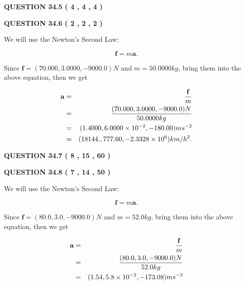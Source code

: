 \documentclass[12pt]{article}
\begin{document}
 
 
  
\vspace{0.2in}
  
{\textbf{\Large{QUESTION
34.5 
 (           4 ,           4 ,           4 )
}}}
  
  
  
\vspace{0.2in}
  
{\textbf{\Large{QUESTION
34.6 
 (           2 ,           2 ,           2 )
}}}
  
  
 
 

We will use the Newton's Second Law:
 
\[
\mathbf{f}=m\mathbf{a}.
\]
 
Since $\mathbf{f}=( %
70.000,  %
3.0000,  %
-9000.0 )N$
and $m= %
50.0000kg$, bring them into the above equation, then we get
 
\begin{eqnarray*}
\mathbf{a}&=&\frac{\mathbf{f}}m  \\
&=&\frac{(
70.000 ,
3.0000 ,
-9000.0 )N
}{ %
50.0000 kg}  \\
&=&(
1.4000 ,
6.0000 \times 10^{-2},
-180.00
)ms^{-2} \\
&=&(
18144. ,
777.60 ,
-2.3328 \times 10^{6}
)km/h^2.
\end{eqnarray*}
 
 
 
  
\vspace{0.2in}
  
{\textbf{\Large{QUESTION
34.7 
 (           8 ,          15 ,          60 )
}}}
  
  
 
 

 
 
  
\vspace{0.2in}
  
{\textbf{\Large{QUESTION
34.8 
 (           7 ,          14 ,          50 )
}}}
  
  
 
 

We will use the Newton's Second Law:
 
\[
\mathbf{f}=m\mathbf{a}.
\]
 
Since $\mathbf{f}= %
(80.0 , 3.0 , -9000.0) N$
and $m= %
52.0kg$, bring them into the above equation, then we get
 
\begin{eqnarray*}
\mathbf{a}&=&\frac{\mathbf{f}}m  \\
&=&\frac{ %
(80.0 , 3.0 , -9000.0) N}{ %
52.0kg}  \\
&=& %
(1.54 , 5.8 \times 10^{-2} , -173.08) ms^{-2}
\end{eqnarray*}
 
\end{document}

